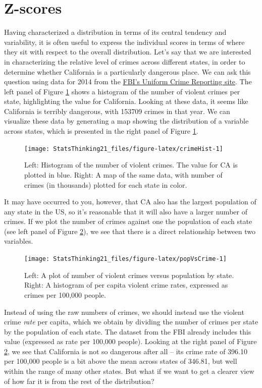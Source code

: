 \documentclass[12pt,]{book}
\theoremstyle{definition}
\theoremstyle{definition}
\theoremstyle{definition}
\theoremstyle{remark}
\begin{document}
\hypertarget{z-scores}{%
\section{Z-scores}\label{z-scores}}

Having characterized a distribution in terms of its central tendency and variability, it is often useful to express the individual scores in terms of where they sit with respect to the overall distribution. Let's say that we are interested in characterizing the relative level of crimes across different states, in order to determine whether California is a particularly dangerous place. We can ask this question using data for 2014 from the \href{https://www.ucrdatatool.gov/Search/Crime/State/RunCrimeOneYearofData.cfm}{FBI's Uniform Crime Reporting site}. The left panel of Figure \ref{fig:crimeHist} shows a histogram of the number of violent crimes per state, highlighting the value for California. Looking at these data, it seems like California is terribly dangerous, with 153709 crimes in that year. We can visualize these data by generating a map showing the distribution of a variable across states, which is presented in the right panel of Figure \ref{fig:crimeHist}.

\begin{figure}
\texttt{[image: StatsThinking21\_files/figure-latex/crimeHist-1]} \caption{Left: Histogram of the number of violent crimes.  The value for CA is plotted in blue. Right: A map of the same data, with number of crimes (in thousands) plotted for each state in color.}\label{fig:crimeHist}
\end{figure}

It may have occurred to you, however, that CA also has the largest population of any state in the US, so it's reasonable that it will also have a larger number of crimes. If we plot the number of crimes against one the population of each state (see left panel of Figure \ref{fig:popVsCrime}), we see that there is a direct relationship between two variables.

\begin{figure}
\texttt{[image: StatsThinking21\_files/figure-latex/popVsCrime-1]} \caption{Left: A plot of number of violent crimes versus population by state. Right: A histogram of per capita violent crime rates, expressed as crimes per 100,000 people.}\label{fig:popVsCrime}
\end{figure}

Instead of using the raw numbers of crimes, we should instead use the violent crime \emph{rate} per capita, which we obtain by dividing the number of crimes per state by the population of each state. The dataset from the FBI already includes this value (expressed as rate per 100,000 people). Looking at the right panel of Figure \ref{fig:popVsCrime}, we see that California is not so dangerous after all -- its crime rate of 396.10 per 100,000 people is a bit above the mean across states of 346.81, but well within the range of many other states. But what if we want to get a clearer view of how far it is from the rest of the distribution?
\end{document}
